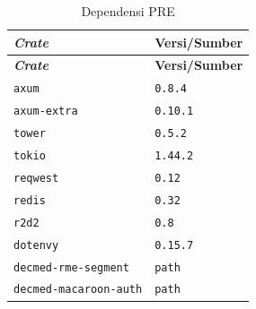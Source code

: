\documentclass[bahasa, 12pt, a4paper, onecolumn, oneside, final]{report}
\begin{document}
\begin{longtable}{|>{\raggedright\arraybackslash}p{}|>{\raggedright\arraybackslash}p{}|}
	\caption{Dependensi PRE}
	\label{tab:dependensi-backend-pre}                    \\
	\hline
	\textbf{\textit{Crate}}       & \textbf{Versi/Sumber} \\
	\hline
	\endfirsthead
	\hline
	\textbf{\textit{Crate}}       & \textbf{Versi/Sumber} \\
	\hline
	\endhead

	\texttt{axum}                 & \texttt{0.8.4}        \\ \hline
	\texttt{axum-extra}           & \texttt{0.10.1}       \\ \hline
	\texttt{tower}                & \texttt{0.5.2}        \\ \hline
	\texttt{tokio}                & \texttt{1.44.2}       \\ \hline
	\texttt{reqwest}              & \texttt{0.12}         \\ \hline
	\texttt{redis}                & \texttt{0.32}         \\ \hline
	\texttt{r2d2}                 & \texttt{0.8}          \\ \hline
	\texttt{dotenvy}              & \texttt{0.15.7}       \\ \hline
	\texttt{decmed-rme-segment}   & \texttt{path}         \\ \hline
	\texttt{decmed-macaroon-auth} & \texttt{path}         \\ \hline
\end{longtable}
\end{document}
